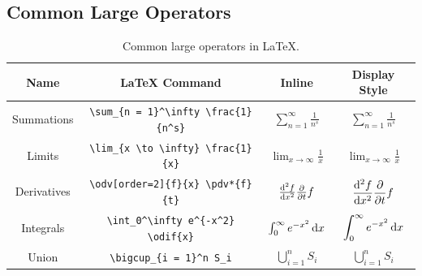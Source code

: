 \documentclass[11pt, twoside]{article}
\begin{document}
\subsection{Common Large Operators}
\begin{table}[H]
    \centering
    \begingroup
    \renewcommand{\arraystretch}{2.2}
    \begin{tabular}{c c c c}
        \toprule
        \textbf{Name} & \textbf{\LaTeX{} Command}                     & \textbf{Inline}                       & \textbf{Display Style}                              \\
        \midrule
        Summations    & \lstinline|\sum_{n = 1}^\infty \frac{1}{n^s}| & \(\sum_{n = 1}^\infty \frac{1}{n^s}\) & \(\displaystyle \sum_{n = 1}^\infty \frac{1}{n^s}\) \\
        Limits        & \lstinline|\lim_{x \to \infty} \frac{1}{x}|   & \(\lim_{x \to \infty} \frac{1}{x}\)   & \(\displaystyle \lim_{x \to \infty} \frac{1}{x}\)   \\
        Derivatives   & \lstinline|\odv[order=2]{f}{x} \pdv*{f}{t}|   & \(\odv[order=2]{f}{x} \pdv*{f}{t}\)   & \(\displaystyle \odv[order=2]{f}{x} \pdv*{f}{t}\)   \\
        Integrals     & \lstinline|\int_0^\infty e^{-x^2} \odif{x}|   & \(\int_0^\infty e^{-x^2} \odif{x}\)   & \(\displaystyle \int_0^\infty e^{-x^2} \odif{x}\)   \\
        Union         & \lstinline|\bigcup_{i = 1}^n S_i|             & \(\bigcup_{i=1}^n S_i\)               & \(\displaystyle \bigcup_{i=1}^n S_i\)               \\
        \bottomrule
    \end{tabular}
    \endgroup
    \caption{Common large operators in \LaTeX{}.} %
\end{table}
\end{document}
